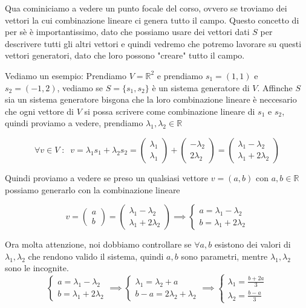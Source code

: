 \documentclass{rapport}
\begin{document}
Qua cominiciamo a vedere un punto focale del corso, ovvero se troviamo dei vettori la cui combinazione lineare ci genera tutto il campo. Questo concetto di per sè è importantissimo, dato che possiamo usare dei vettori dati $S$ per descrivere tutti gli altri vettori e quindi vedremo che potremo lavorare su questi vettori generatori, dato che loro possono "creare" tutto il campo. 

Vediamo un esempio: Prendiamo $V=\mathbb{R}^2$ e prendiamo $s_1 = (1, 1)$ e $s_2 = (-1, 2)$, vediamo se $S=\{s_1, s_2\}$ è un sistema generatore di $V$. Affinche $S$ sia un sistema generatore bisgona che la loro combinazione lineare è neccesario che ogni vettore di $V$ si possa scrivere come combinazione lineare di $s_1$ e $s_2$, quindi proviamo a vedere, prendiamo $\lambda_1,\lambda_2 \in \mathbb{R}$

\[
\forall v \in V \; : \;\; v = \lambda_1 s_1 + \lambda_2 s_2 = \begin{pmatrix}
  \lambda_1 \\
  \lambda_1
\end{pmatrix} +  \begin{pmatrix}
  -\lambda_2 \\
  2\lambda_2 
\end{pmatrix} =  \begin{pmatrix}
  \lambda_1-\lambda_2 \\
  \lambda_1+2\lambda_2 
\end{pmatrix}
\]


Quindi proviamo a vedere se preso un qualsiasi vettore $v = (a,b)$ con $a,b \in \mathbb{R}$ possiamo generarlo con la combinazione lineare

\[
v = \begin{pmatrix}
  a \\
  b
\end{pmatrix} = \begin{pmatrix}
  \lambda_1-\lambda_2 \\
  \lambda_1+2\lambda_2 
\end{pmatrix} \implies \begin{cases}
  a = \lambda_1-\lambda_2 \\
  b = \lambda_1+2\lambda_2 
\end{cases}
\]

Ora molta attenzione, noi dobbiamo controllare se $\forall a,b$ esistono dei valori di $\lambda_1, \lambda_2$ che rendono valido il sistema, quindi $a,b$ sono parametri, mentre $\lambda_1, \lambda_2$ sono le incognite.
\[
 \begin{cases}
  a = \lambda_1-\lambda_2 \\
  b = \lambda_1+2\lambda_2 
\end{cases} \implies\begin{cases}
  \lambda_1  = \lambda_2+a\\
  b-a = 2\lambda_2 + \lambda_2
\end{cases} \implies \begin{cases}
  \lambda_1  = \frac{b+2a}{3}\\
\lambda_2 = \frac{b-a}{3}
\end{cases}
\]
\end{document}
